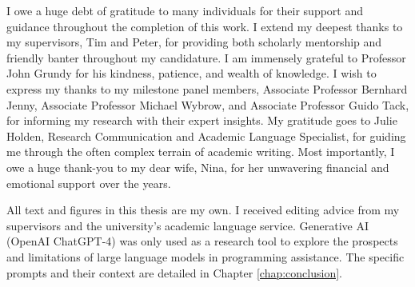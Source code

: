 \documentclass[
11pt, %
english, %
singlespacing, %
headsepline, %
]{MastersDoctoralThesis} %
\begin{document}


\begin{acknowledgements}
\addchaptertocentry{\acknowledgementname} %

I owe a huge debt of gratitude to many individuals for their support and guidance throughout the completion of this work. I extend my deepest thanks to my supervisors, Tim and Peter, for providing both scholarly mentorship and friendly banter throughout my candidature. I am immensely grateful to Professor John Grundy for his kindness, patience, and wealth of knowledge. I wish to express my thanks to my milestone panel members, Associate Professor Bernhard Jenny, Associate Professor Michael Wybrow, and Associate Professor Guido Tack, for informing my research with their expert insights. My gratitude goes to Julie Holden, Research Communication and Academic Language Specialist, for guiding me through the often complex terrain of academic writing. Most importantly, I owe a huge thank-you to my dear wife, Nina, for her unwavering financial and emotional support over the years.
 
All text and figures in this thesis are my own. I received editing advice from my supervisors and the university's academic language service. Generative AI (OpenAI ChatGPT-4) was only used as a research tool to explore the prospects and limitations of large language models in programming assistance. The specific prompts and their context are detailed in Chapter \ref{chap:conclusion}.

\end{acknowledgements}


\tableofcontents %

\listoffigures %


\end{document}
